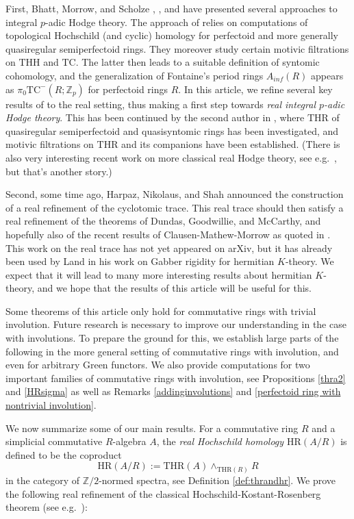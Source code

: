 \documentclass[10pt]{amsart}
\theoremstyle{definition}
\numberwithin{equation}{section}
\newcommand{\Z}{\mathbb{Z}}
\newcommand{\HR}{\mathrm{HR}}
\newcommand{\THH}{\mathrm{THH}}
\newcommand{\THR}{\mathrm{THR}}
\newcommand{\TC}{\mathrm{TC}}
\begin{document}
First, Bhatt, Morrow, and Scholze \cite{BMS18}, \cite{BMS19}, and \cite{BS22} have presented several approaches to integral $p$-adic Hodge theory. The approach of \cite{BMS19} relies on computations of topological Hochschild (and cyclic) homology for perfectoid and more generally quasiregular semiperfectoid rings.  They moreover study certain motivic filtrations on $\THH$ and $\TC$.
The latter then leads to a suitable definition of syntomic cohomology, and the generalization of Fontaine's period rings $A_{inf}(R)$ appears as $\pi_0 \TC^{-}(R;\Z_p)$ for perfectoid rings $R$.
In this article, we refine several key results of \cite{BMS19} to the real setting, thus making a first step towards \emph{real integral $p$-adic Hodge theory}.
This has been continued by the second author in \cite{Par23},
where $\THR$ of quasiregular semiperfectoid and quasisyntomic rings has been investigated, and motivic filtrations on $\THR$ and its companions have been established.
(There is also very interesting recent work on more classical real Hodge theory, see e.g.\ \cite{BW20}, but that's another story.)

Second, some time ago, Harpaz, Nikolaus, and Shah announced the construction of a real refinement of the cyclotomic trace. This real trace should then satisfy a real refinement of the theorems of Dundas, Goodwillie, and McCarthy, and hopefully also of the recent results of Clausen-Mathew-Morrow \cite{CMM21} as quoted in \cite[Theorem 7.15]{BMS19}. This work on the real trace has not yet appeared on arXiv, but it has already been used by Land \cite{L23}
in his work on Gabber rigidity for hermitian $K$-theory. We expect that it will lead to many more interesting results about hermitian $K$-theory, and we hope that the results of this article will be useful for this. 

\medskip
Some theorems of this article only hold for commutative rings with trivial involution. Future research is necessary to improve our understanding in the case with involutions. To prepare the ground for this, we establish large parts of the  following in the more general setting of commutative rings with involution, and even for arbitrary Green functors. We also provide computations for two important families of commutative rings with involution,
see Propositions \ref{thra2} and \ref{HRsigma} as well as Remarks \ref{addinginvolutions} and \ref{perfectoid ring with nontrivial involution}.

\medskip

We now summarize some of our main results.
For a commutative ring $R$ and a simplicial commutative $R$-algebra $A$,
the \emph{real Hochschild homology $\HR(A/R)$} is defined to be the coproduct
\[
\HR(A/R)
:=
\THR(A)\wedge_{\THR(R)}R
\]
in the category of $\Z/2$-normed spectra,
see Definition \ref{def:thrandhr}.
We prove the following real refinement of the classical Hochschild-Kostant-Rosenberg theorem (see e.g.\ \cite[Theorem 9.4.7]{Weibel}):
\end{document}
